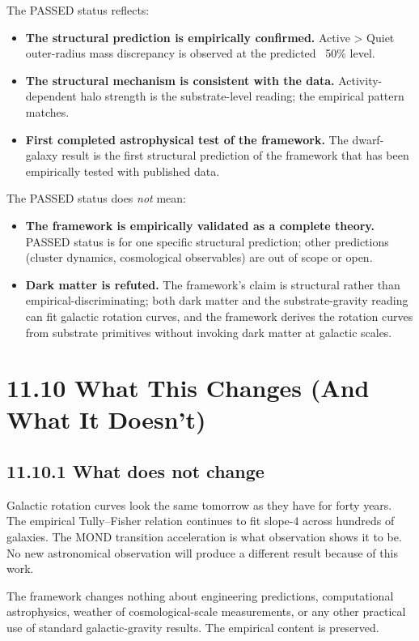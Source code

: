 \documentclass[11pt]{book}
\begin{document}
The PASSED status reflects:
\begin{itemize}
\item \textbf{The structural prediction is empirically confirmed.} Active > Quiet outer-radius mass discrepancy is observed at the predicted ~50\% level.
\item \textbf{The structural mechanism is consistent with the data.} Activity-dependent halo strength is the substrate-level reading; the empirical pattern matches.
\item \textbf{First completed astrophysical test of the framework.} The dwarf-galaxy result is the first structural prediction of the framework that has been empirically tested with published data.
\end{itemize}

The PASSED status does \textit{not} mean:
\begin{itemize}
\item \textbf{The framework is empirically validated as a complete theory.} PASSED status is for one specific structural prediction; other predictions (cluster dynamics, cosmological observables) are out of scope or open.
\item \textbf{Dark matter is refuted.} The framework's claim is structural rather than empirical-discriminating; both dark matter and the substrate-gravity reading can fit galactic rotation curves, and the framework derives the rotation curves from substrate primitives without invoking dark matter at galactic scales.
\end{itemize}

\section{11.10 What This Changes (And What It Doesn't)}

\subsection{11.10.1 What does not change}

Galactic rotation curves look the same tomorrow as they have for forty years. The empirical Tully–Fisher relation continues to fit slope-4 across hundreds of galaxies. The MOND transition acceleration is what observation shows it to be. No new astronomical observation will produce a different result because of this work.

The framework changes nothing about engineering predictions, computational astrophysics, weather of cosmological-scale measurements, or any other practical use of standard galactic-gravity results. The empirical content is preserved.
\end{document}
